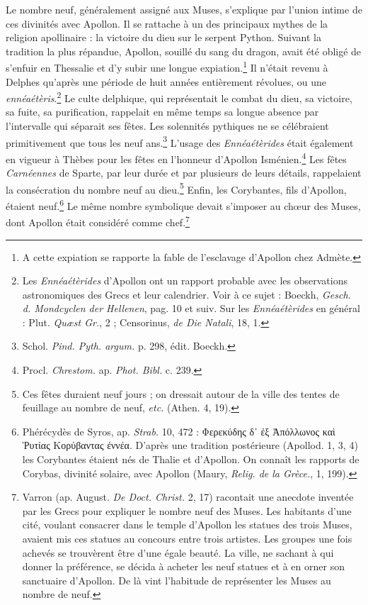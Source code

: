 \documentclass[landscape, a4paper, 11pt, oneside, polutonikogreek, french]{article}
\begin{document}
Le nombre neuf, généralement assigné aux Muses, s'explique par l'union intime de ces divinités avec Apollon. Il se rattache à un des principaux mythes de la religion apollinaire : la victoire du dieu sur le serpent Python. Suivant la tradition la plus répandue, Apollon, souillé du sang du dragon, avait été obligé de s'enfuir en Thessalie et d'y subir une longue expiation.\footnote{A cette expiation se rapporte la fable de l'esclavage d'Apollon chez Admète.} Il n'était revenu à Delphes qu'après une période de huit années entièrement révolues, ou une \emph{ennéaétèris}.\footnote{Les \emph{Ennéaétèrides} d'Apollon ont un rapport probable avec les observations astronomiques des Grecs et leur calendrier. Voir à ce sujet : Boeckh, \emph{Gesch. d. Mondcyclen der Hellenen}, pag. 10 et suiv. Sur les \emph{Ennéaétèrides} en général : Plut. \emph{Quæst Gr.}, 2 ; Censorinus, \emph{de Die Natali}, 18, 1.} Le culte delphique, qui représentait le combat du dieu, sa victoire, sa fuite, sa purification, rappelait en même temps sa longue absence par l'intervalle qui séparait ses fêtes. Les solennités pythiques ne se célébraient primitivement que tous les neuf ans.\footnote{Schol. \emph{Pind. Pyth. argum.} p. 298, édit. Boeckh.} L'usage des \emph{Ennéaétèrides} était également en vigueur à Thèbes pour les fêtes en l'honneur d'Apollon Isménien.\footnote{Procl. \emph{Chrestom.} ap. \emph{Phot. Bibl.} c. 239.} Les fêtes \emph{Carnéennes} de Sparte, par leur durée et par plusieurs de leurs détails, rappelaient la consécration du nombre neuf au dieu.\footnote{Ces fêtes duraient neuf jours ; on dressait autour de la ville des tentes de feuillage au nombre de neuf, \emph{etc.} (Athen. 4, 19).} Enfin, les Corybantes, fils d'Apollon, étaient neuf.\footnote{Phérécydès de Syros, ap. \emph{Strab.} 10, 472 : Φερεκύδης δ᾽ ἐξ Ἀπόλλωνος καὶ Ῥυτίας Κορύβαντας ἐννέα. D'après une tradition postérieure (Apollod. 1, 3, 4) les Corybantes étaient nés de Thalie et d'Apollon. On connaît les rapports de Corybas, divinité solaire, avec Apollon (Maury, \emph{Relig. de la Grèce.}, 1, 199).} Le même nombre symbolique devait s'imposer au chœur des Muses, dont Apollon était considéré comme chef.\footnote{Varron (ap. August. \emph{De Doct. Christ.} 2, 17) racontait une anecdote inventée par les Grecs pour expliquer le nombre neuf des Muses. Les habitants d'une cité, voulant consacrer dans le temple d'Apollon les statues des trois Muses, avaient mis ces statues au concours entre trois artistes. Les groupes une fois achevés se trouvèrent être d'une égale beauté. La ville, ne sachant à qui donner la préférence, se décida à acheter les neuf statues et à en orner son sanctuaire d'Apollon. De là vint l'habitude de représenter les Muses au nombre de neuf.}
\end{document}
